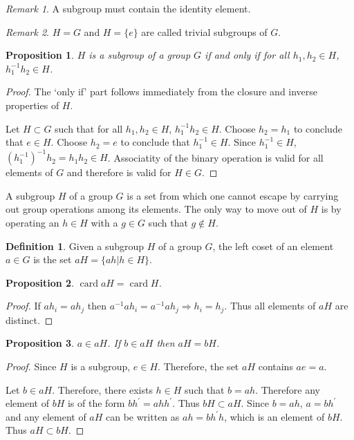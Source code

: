 \documentclass{article}
\DeclareMathOperator{\card}{card}
\theoremstyle{plain}
\numberwithin{thm}{section}
\theoremstyle{plain}
\newtheorem{prop}{Proposition}
\numberwithin{prop}{section}
\theoremstyle{definition}
\newtheorem{defn}{Definition}
\numberwithin{defn}{section}
\theoremstyle{remark}
\newtheorem*{rem}{Remark}
\numberwithin{equation}{section}
\begin{document}
\begin{rem}
A subgroup must contain the identity element.
\end{rem}

\begin{rem}
$H = G$ and $H = \{e\}$ are called trivial subgroups of $G$.
\end{rem}

\begin{prop}\label{s3p1}
$H$ is a subgroup of a group $G$ if and only if for all $h_1, h_2 \in H$,
$h_1^{-1}h_2 \in H$.
\end{prop}
\begin{proof}
The `only if' part follows immediately from the closure and inverse properties
of $H$.

Let $H \subset G$ such that for all $h_1, h_2 \in H$, $h_1^{-1}h_2 \in H$.
Choose $h_2 = h_1$ to conclude that $e \in H$. Choose $h_2 = e$ to conclude
that $h_1^{-1} \in H$. Since $h_1^{-1} \in H$, $(h_1^{-1})^{-1}h_2 = h_1h_2
\in H$. Associatity of the binary operation is valid for all elements of $G$
and therefore is valid for $H \in G$.
\end{proof}

A subgroup $H$ of a group $G$ is a set from which one cannot escape by carrying
out group operations among its elements. The only way to move out of $H$ is
by operating an $h \in H$ with a $g \in G$ such that $g \notin H$.

\begin{defn}\label{s3d2}
Given a subgroup $H$ of a group $G$, the left coset of an element $a \in G$
is the set $aH = \{ah | h \in H\}$.
\end{defn}

\begin{prop}\label{s3p2}
$\card{aH} = \card{H}$.
\end{prop}
\begin{proof}
If $ah_i = ah_j$ then $a^{-1}ah_i = a^{-1}ah_j \Rightarrow h_i = h_j$. Thus
all elements of $aH$ are distinct.
\end{proof}

\begin{prop}\label{s3p3}
$a \in aH$. If $b \in aH$ then $aH = bH$.
\end{prop}
\begin{proof}
Since $H$ is a subgroup, $e \in H$. Therefore, the set $aH$ contains $ae = a$.

Let $b \in aH$. Therefore, there exists $h \in H$ such that $b = ah$. Therefore
any element of $bH$ is of the form $bh^\prime = ahh^\prime$. Thus $bH \subset
aH$. Since $b = ah$, $a = bh^\prime$ and any element of $aH$ can be written
as $ah = bh^\prime h$, which is an element of $bH$. Thus $aH \subset bH$.
\end{proof}
\end{document}
